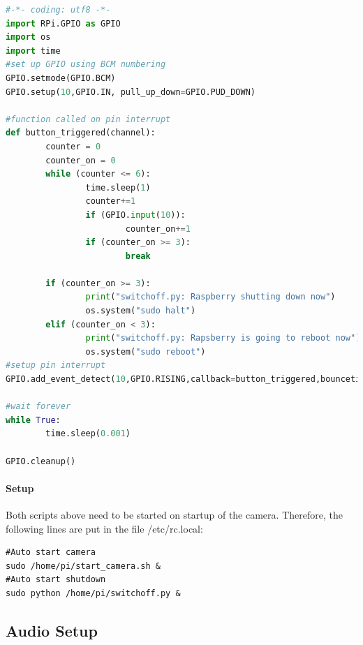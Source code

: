 \begin{center}
\begin{minipage}{0.9\linewidth}
\begin{lstlisting}[caption=$\sim\hspace{-0.5em}/switchoff.sh$, label=switchoff, language=Python, frame=none]
#-*- coding: utf8 -*-
import RPi.GPIO as GPIO
import os
import time
#set up GPIO using BCM numbering
GPIO.setmode(GPIO.BCM)
GPIO.setup(10,GPIO.IN, pull_up_down=GPIO.PUD_DOWN)

#function called on pin interrupt
def button_triggered(channel):
        counter = 0
        counter_on = 0
        while (counter <= 6):
                time.sleep(1)
                counter+=1
                if (GPIO.input(10)):
                        counter_on+=1
                if (counter_on >= 3):
                        break

        if (counter_on >= 3):
                print("switchoff.py: Raspberry shutting down now")
                os.system("sudo halt")
        elif (counter_on < 3):
                print("switchoff.py: Rapsberry is going to reboot now")
                os.system("sudo reboot")
#setup pin interrupt
GPIO.add_event_detect(10,GPIO.RISING,callback=button_triggered,bouncetime=300)

#wait forever
while True:
        time.sleep(0.001)

GPIO.cleanup()
\end{lstlisting}
\end{minipage}
\end{center}

\paragraph{Setup}

Both scripts above need to be started on startup of the camera. Therefore, the following lines are put in the file /etc/rc.local:
\begin{center}
\begin{minipage}{0.9\linewidth}
\begin{lstlisting}[caption=$/etc/rc.local$, label=local, frame=none]
#Auto start camera
sudo /home/pi/start_camera.sh &
#Auto start shutdown
sudo python /home/pi/switchoff.py &
\end{lstlisting}
\end{minipage}
\end{center}

\subsection{Audio Setup}



